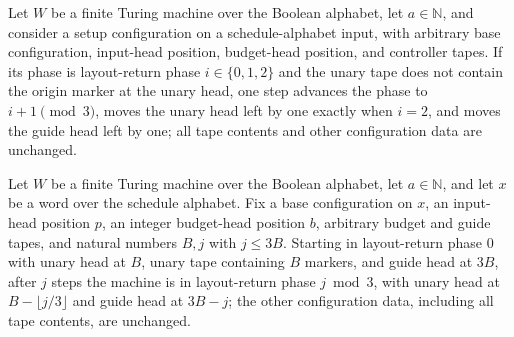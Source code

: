\begin{lemma}
\label{Complexity.setupCfg_layout_return_step}
\leanok
{}
Let $W$ be a finite Turing machine over the Boolean alphabet, let $a\in\mathbb{N}$, and
consider a setup configuration on a schedule-alphabet input, with arbitrary base
configuration, input-head position, budget-head position, and controller tapes. If its
phase is layout-return phase $i\in\{0,1,2\}$ and the unary tape does not contain the
origin marker at the unary head, one step advances the phase to $i+1\pmod 3$, moves the
unary head left by one exactly when $i=2$, and moves the guide head left by one; all
tape contents and other configuration data are unchanged.
\end{lemma}

\begin{lemma}
\label{Complexity.setupCfg_layout_return_prefix}
\leanok
{}
Let $W$ be a finite Turing machine over the Boolean alphabet, let $a\in\mathbb{N}$, and
let $x$ be a word over the schedule alphabet. Fix a base configuration on $x$, an
input-head position $p$, an integer budget-head position $b$, arbitrary budget and guide
tapes, and natural numbers $B,j$ with $j\le 3B$. Starting in layout-return phase $0$
with unary head at $B$, unary tape containing $B$ markers, and guide head at $3B$, after
$j$ steps the machine is in layout-return phase $j\bmod 3$, with unary head at
$B-\lfloor j/3\rfloor$ and guide head at $3B-j$; the other configuration data, including
all tape contents, are unchanged.
\end{lemma}

